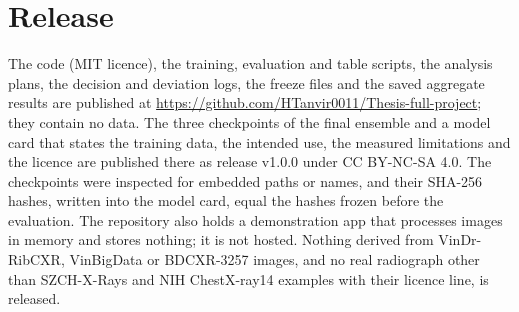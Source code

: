\section{Release}
The code (MIT licence), the training, evaluation and table scripts, the analysis plans, the decision and deviation logs, the freeze files and
the saved aggregate results are published at \url{https://github.com/HTanvir0011/Thesis-full-project}; they contain no data. The three
checkpoints of the final ensemble and a model card that states the training data, the intended use, the measured limitations and the licence
are published there as release v1.0.0 under CC BY-NC-SA 4.0. The checkpoints were inspected for embedded paths or names, and their SHA-256
hashes, written into the model card, equal the hashes frozen before the evaluation. The repository also holds a demonstration app that
processes images in memory and stores nothing; it is not hosted. Nothing derived from VinDr-RibCXR, VinBigData or BDCXR-3257 images, and no real
radiograph other than SZCH-X-Rays and NIH ChestX-ray14 examples with their licence line, is released.
